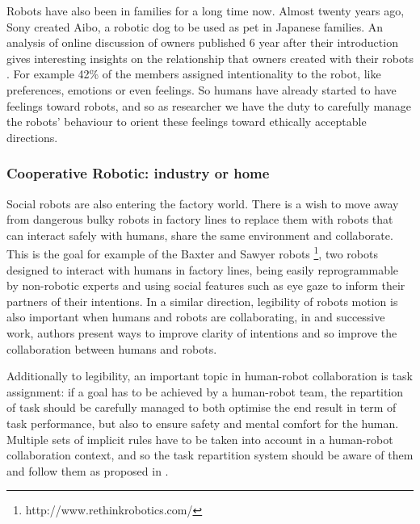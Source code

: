     Robots have also been in families for a long time now. Almost twenty years
    ago, Sony created Aibo, a robotic dog to be used as pet in Japanese
    families. An analysis of online discussion of owners published 6 year after
    their introduction gives interesting insights on the relationship that
    owners created with their robots \citep{friedman2003hardware}. For example
    42\% of the members assigned intentionality to the robot, like preferences,
    emotions or even feelings. So humans have already started to have feelings
    toward robots, and so as researcher we have the duty to carefully manage the
    robots' behaviour to orient these feelings toward ethically acceptable
    directions.

\subsubsection{Cooperative Robotic: industry or home}
	
    Social robots are also entering the factory world. There is a wish to move
    away from dangerous bulky robots in factory lines to replace them with
    robots that can interact safely with humans, share the same environment and
    collaborate. This is the goal for example of the Baxter and Sawyer robots
    \footnote{http://www.rethinkrobotics.com/}, two robots designed to interact
    with humans in factory lines, being easily reprogrammable by non-robotic
    experts and using social features such as eye gaze to inform their partners
    of their intentions. In a similar direction, legibility of robots motion is
    also important when humans and robots are collaborating, in
    \citet{dragan2013legibility} and successive work, authors present ways to
    improve clarity of intentions and so improve the collaboration between
    humans and robots.

    Additionally to legibility, an important topic in human-robot collaboration
    is task assignment: if a goal has to be achieved by a human-robot team, the
    repartition of task should be carefully managed to both optimise the end
    result in term of task performance, but also to ensure safety and mental
    comfort for the human. Multiple sets of implicit rules have to be taken into
    account in a human-robot collaboration context, and so the task repartition
    system should be aware of them and follow them as proposed in
    \citet{montreuil2007planning}.
	

